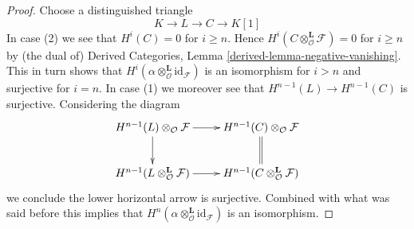 \documentclass[10pt,a4paper]{amsart}
\theoremstyle{plain}
\theoremstyle{definition}
\theoremstyle{remark}
\numberwithin{equation}{subsection}
\begin{document}
\begin{proof}
Choose a distinguished triangle
$$
K \to L \to C \to K[1]
$$
In case (2) we see that $H^i(C) = 0$ for $i \geq n$.
Hence $H^i(C \otimes_\mathcal{O}^\mathbf{L} \mathcal{F}) = 0$
for $i \geq n$ by (the dual of)
Derived Categories, Lemma \ref{derived-lemma-negative-vanishing}.
This in turn shows that
$H^i(\alpha \otimes_\mathcal{O}^\mathbf{L} \text{id}_\mathcal{F})$
is an isomorphism for $i > n$ and surjective for $i = n$.
In case (1) we moreover see that $H^{n - 1}(L) \to H^{n - 1}(C)$
is surjective. Considering the diagram
$$
\xymatrix{
H^{n - 1}(L) \otimes_\mathcal{O} \mathcal{F} \ar[r] \ar[d] &
H^{n - 1}(C) \otimes_\mathcal{O} \mathcal{F} \ar@{=}[d] \\
H^{n - 1}(L \otimes_\mathcal{O}^\mathbf{L} \mathcal{F}) \ar[r] &
H^{n - 1}(C \otimes_\mathcal{O}^\mathbf{L} \mathcal{F})
}
$$
we conclude the lower horizontal arrow is surjective. Combined with what
was said before this implies that
$H^n(\alpha \otimes_\mathcal{O}^\mathbf{L} \text{id}_\mathcal{F})$
is an isomorphism.
\end{proof}
\end{document}
